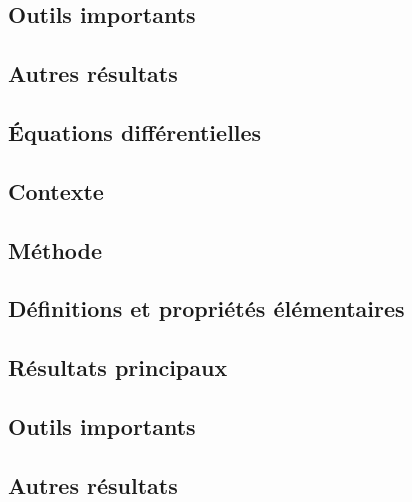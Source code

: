 \documentclass[11pt,a4paper]{article}
\begin{document}
\subsection*{Outils importants}


\subsection*{Autres résultats}

\newpage
\begin{center}  
\section*{Équations différentielles} 
\end{center}




\subsection*{Contexte}

\subsection*{Méthode}

\subsection*{Définitions et propriétés élémentaires}

\subsection*{Résultats principaux}

\subsection*{Outils importants}


\subsection*{Autres résultats}
\end{document}
